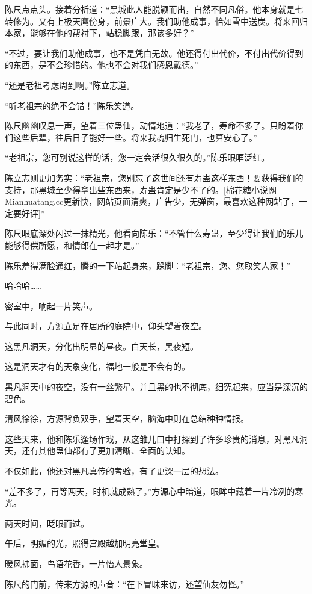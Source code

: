 \begin{this_body}
陈尺点点头。接着分析道：“黑城此人能脱颖而出，自然不同凡俗。他本身就是七转修为。又有上极天鹰傍身，前景广大。我们助他成事，恰如雪中送炭。将来回归本家，能够在他的帮衬下，站稳脚跟，那该多好？”

“不过，要让我们助他成事，也不是凭白无故。他还得付出代价，不付出代价得到的东西，是不会珍惜的。他也不会对我们感恩戴德。”

“还是老祖考虑周到啊。”陈立志道。

“听老祖宗的绝不会错！”陈乐笑道。

陈尺幽幽叹息一声，望着三位蛊仙，动情地道：“我老了，寿命不多了。只盼着你们这些后辈，往后日子能好一些。将来我魂归生死门，也算安心了。”

“老祖宗，您可别说这样的话，您一定会活很久很久的。”陈乐眼眶泛红。

陈立志则更加务实：“老祖宗，您别忘了这世间还有寿蛊这样东西！要获得我们的支持，那黑城至少得拿出些东西来，寿蛊肯定是少不了的。[棉花糖小说网Mianhuatang.cc更新快，网站页面清爽，广告少，无弹窗，最喜欢这种网站了，一定要好评]”

陈尺眼底深处闪过一抹精光，他看向陈乐：“不管什么寿蛊，至少得让我们的乐儿能够得偿所愿，和情郎在一起才是。”

陈乐羞得满脸通红，腾的一下站起身来，跺脚：“老祖宗，您、您取笑人家！”

哈哈哈……

密室中，响起一片笑声。

与此同时，方源立足在居所的庭院中，仰头望着夜空。

这黑凡洞天，分化出明显的昼夜。白天长，黑夜短。

这是洞天才有的天象变化，福地一般是不会有的。

黑凡洞天中的夜空，没有一丝繁星。并且黑的也不彻底，细究起来，应当是深沉的碧色。

清风徐徐，方源背负双手，望着天空，脑海中则在总结种种情报。

这些天来，他和陈乐逢场作戏，从这雏儿口中打探到了许多珍贵的消息，对黑凡洞天，还有其他蛊仙都有了更加清晰、全面的认知。

不仅如此，他还对黑凡真传的考验，有了更深一层的想法。

“差不多了，再等两天，时机就成熟了。”方源心中暗道，眼眸中藏着一片冷冽的寒光。

两天时间，眨眼而过。

午后，明媚的光，照得宫殿越加明亮堂皇。

暖风拂面，鸟语花香，一片怡人景象。

陈尺的门前，传来方源的声音：“在下冒昧来访，还望仙友勿怪。”


\end{this_body}
